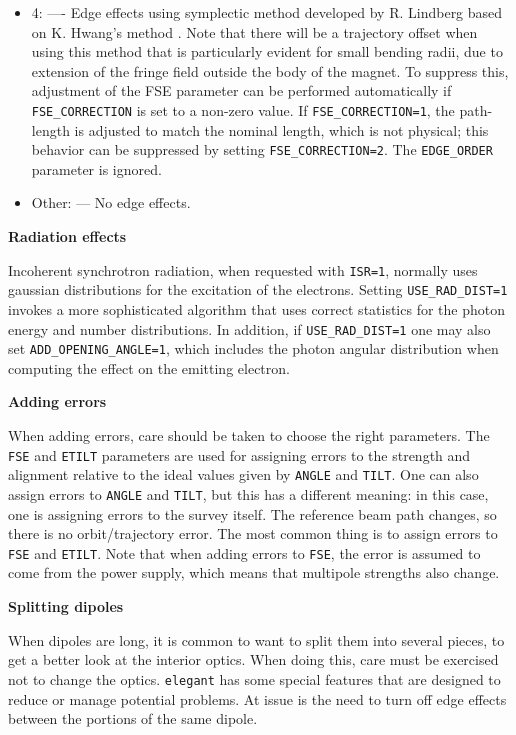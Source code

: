 \begin{itemize}
  \item 4: ---- Edge effects using symplectic method developed by R. Lindberg based on K. Hwang's method \cite{KHwang}.
  Note that there will be a trajectory offset when using this method that is particularly evident for small bending radii, due to
  extension of the fringe field outside the body of the magnet. To suppress this, adjustment of the FSE parameter can be performed automatically 
  if \verb|FSE_CORRECTION| is set to a non-zero value. If \verb|FSE_CORRECTION=1|, the path-length is adjusted to match the nominal
  length, which is not physical; this behavior can be suppressed by setting \verb|FSE_CORRECTION=2|.
  The \verb|EDGE_ORDER| parameter is ignored.
  \item Other: --- No edge effects.
\end{itemize}

{\bf Radiation effects}

Incoherent synchrotron radiation, when requested with {\tt ISR=1},
normally uses gaussian distributions for the excitation of the electrons.
Setting {\tt USE\_RAD\_DIST=1} invokes a more sophisticated algorithm that
uses correct statistics for the photon energy and number distributions.
In addition, if {\tt USE\_RAD\_DIST=1} one may also set {\tt ADD\_OPENING\_ANGLE=1},
which includes the photon angular distribution when computing the effect on 
the emitting electron.  

{\bf Adding errors}

When adding errors, care should be taken to choose the right
parameters.  The \verb|FSE| and \verb|ETILT| parameters are used for
assigning errors to the strength and alignment relative to the ideal
values given by \verb|ANGLE| and \verb|TILT|.  One can also assign 
errors to \verb|ANGLE| and \verb|TILT|, but this has a different meaning:
in this case, one is assigning errors to the survey itself.  The reference
beam path changes, so there is no orbit/trajectory error. The most common
thing is to assign errors to \verb|FSE| and \verb|ETILT|.  Note that when
adding errors to \verb|FSE|, the error is assumed to come from the power
supply, which means that multipole strengths also change.



{\bf Splitting dipoles}

When dipoles are long, it is
common to want to split them into several pieces, to get a better look
at the interior optics.  When doing this, care must be exercised not
to change the optics.  {\tt elegant} has some special features that
are designed to reduce or manage potential problems. At issue is the
need to turn off edge effects between the portions of the same dipole.

